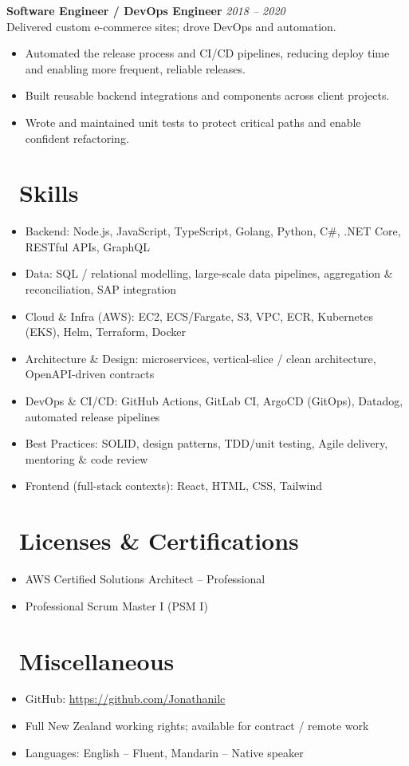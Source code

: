 \documentclass{resume}
\begin{document}
\vspace{1em}

\textbf{Software Engineer / DevOps Engineer} \hfill \textit{2018 -- 2020} \\
Delivered custom e-commerce sites; drove DevOps and automation.
\begin{itemize}
  \item Automated the release process and CI/CD pipelines, reducing deploy time and enabling more frequent, reliable releases.
  \item Built reusable backend integrations and components across client projects.
  \item Wrote and maintained unit tests to protect critical paths and enable confident refactoring.
\end{itemize}


\section{\faCogs\ Skills}
\begin{itemize}[parsep=0.5ex]
  \item Backend: Node.js, JavaScript, TypeScript, Golang, Python, C\#, .NET Core, RESTful APIs, GraphQL
  \item Data: SQL / relational modelling, large-scale data pipelines, aggregation \& reconciliation, SAP integration
  \item Cloud \& Infra (AWS): EC2, ECS/Fargate, S3, VPC, ECR, Kubernetes (EKS), Helm, Terraform, Docker
  \item Architecture \& Design: microservices, vertical-slice / clean architecture, OpenAPI-driven contracts
  \item DevOps \& CI/CD: GitHub Actions, GitLab CI, ArgoCD (GitOps), Datadog, automated release pipelines
  \item Best Practices: SOLID, design patterns, TDD/unit testing, Agile delivery, mentoring \& code review
  \item Frontend (full-stack contexts): React, HTML, CSS, Tailwind
\end{itemize}

\section{\faHeartO\ Licenses \& Certifications}
\begin{itemize}[parsep=0.5ex]
  \item AWS Certified Solutions Architect -- Professional
  \item Professional Scrum Master I (PSM I)
\end{itemize}


\section{\faInfo\ Miscellaneous}
\begin{itemize}[parsep=0.5ex]
  \item GitHub: \url{https://github.com/Jonathanilc}
  \item Full New Zealand working rights; available for contract / remote work
  \item Languages: English -- Fluent, Mandarin -- Native speaker
\end{itemize}
\end{document}
